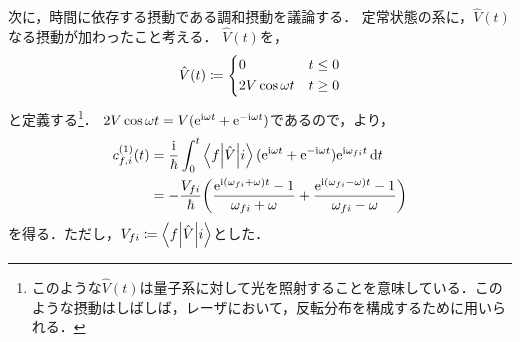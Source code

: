 \documentclass{report}
\begin{document}
  次に，時間に依存する摂動である調和摂動を議論する．
  定常状態の系に，$\hat{V}(t)$なる摂動が加わったこと考える．
  $\hat{V}(t)$を，
  \begin{align}
    \hat{V}(t) \coloneqq
    \begin{dcases}
      0 & t \leq 0 \\
      2V\cos\omega t & t \geq 0 
    \end{dcases}
  \end{align}
  と定義する\footnote{このような$\hat{V}(t)$は量子系に対して光を照射することを意味している．このような摂動はしばしば，レーザにおいて，反転分布を構成するために用いられる．}．
  $2V\cos\omega t = V(\mathrm{e}^{\mathrm{i}\omega t} + \mathrm{e}^{-\mathrm{i}\omega t})$であるので，より，
  \begin{align}
    c^{(1)}_{f, i}(t) &= \frac{\mathrm{i}}{\hbar}\int_{0}^{t}\mel**{f}{\hat{V}}{i}(\mathrm{e}^{\mathrm{i}\omega t} + \mathrm{e}^{-\mathrm{i}\omega t})\mathrm{e}^{\mathrm{i}\omega_{fi}t}\dd{t} \label{harmonic-perturbation-cn1t-progress} \\ 
    &= -\frac{V_{fi}}{\hbar}\qty(\frac{\mathrm{e}^{\mathrm{i}(\omega_{fi} + \omega)t} - 1}{\omega_{fi} + \omega} + \frac{\mathrm{e}^{\mathrm{i}(\omega_{fi}-\omega)t} - 1}{\omega_{fi} - \omega})
  \end{align}
  を得る．ただし，$V_{fi} \coloneqq \mel**{f}{\hat{V}}{i}$とした．
\end{document}

